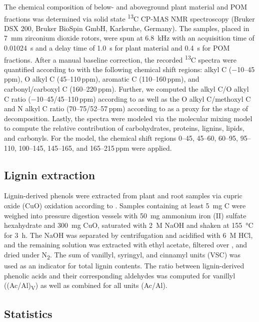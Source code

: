 The chemical composition of below- and aboveground plant material and POM fractions was determined via solid state \textsuperscript{13}C CP-MAS NMR spectroscopy (Bruker DSX 200, Bruker BioSpin GmbH, Karlsruhe, Germany). The samples, placed in \SI{7}{\milli\metre} zirconium dioxide rotors, were spun at \SI{6.8}{\kilo\hertz} with an acquisition time of \SI{0.01024}{\second} and a delay time of \SI{1.0}{\second} for plant material and \SI{0.4}{\second} for POM fractions. After a manual baseline correction, the recorded \textsuperscript{13}C spectra were quantified according to \citet{Mueller2009} with the following chemical shift regions: alkyl C ($-$10--45\,ppm), O alkyl C (45--110\,ppm), aromatic C (110--160\,ppm), and carbonyl/carboxyl C (160--220\,ppm). Further, we computed the alkyl C/O alkyl C ratio ($-$10--45/45--110\,ppm) according to \citet{Baldock1997} as well as the O alkyl C/methoxyl C and N alkyl C ratio (70--75/52--57\,ppm) according to \citet{Bonanomi2013} as a proxy for the stage of decomposition. Lastly, the spectra were modeled via the molecular mixing model \citep{Nelson2005, Prater2020} to compute the relative contribution of carbohydrates, proteins, lignins, lipids, and carbonyls. For the model, the chemical shift regions 0--45, 45--60, 60--95, 95--110, 100--145, 145--165, and 165--215\,ppm were applied.

\subsection{Lignin extraction}

Lignin-derived phenols were extracted from plant and root samples via cupric oxide (CuO) oxidation according to \citet{Angst2017}. Samples containing at least \SI{5}{\milli\gram} C were weighed into pressure digestion vessels with \SI{50}{\milli\gram} ammonium iron (II) sulfate hexahydrate and \SI{300}{\milli\gram} CuO, saturated with \SI{2}{M} NaOH and shaken at \SI{155}{\degreeCelsius} for \SI{3}{\hour}. The NaOH was separated by centrifugation and acidified with \SI{6}{M} HCl, and the remaining solution was extracted with ethyl acetate, filtered over , and dried under N\textsubscript{2}. The sum of vanillyl, syringyl, and cinnamyl units (VSC) was used as an indicator for total lignin contents. The ratio between lignin-derived phenolic acids and their corresponding aldehydes was computed for vanillyl ((Ac/Al)\textsubscript{V}) as well as combined for all units (Ac/Al).

\subsection{Statistics}

